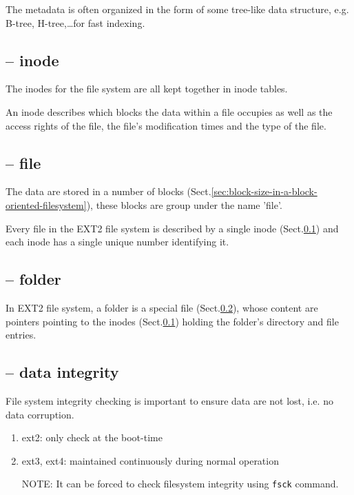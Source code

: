 The metadata is often organized in the form of some tree-like data structure,
e.g. B-tree, H-tree,\ldots for fast indexing. 


\subsection{-- inode}
\label{sec:inode-in-a-block-oriented-filesystem}

The inodes for the file system are all kept together in inode tables.

An inode describes which blocks the data within a file occupies as well as the
access rights of the file, the file's modification times and the type of the
file.

\subsection{-- file}
\label{sec:file-in-a-block-oriented-filesystem}

The data are stored in a number of blocks
(Sect.\ref{sec:block-size-in-a-block-oriented-filesystem}), these blocks are
group under the name 'file'.

Every file in the EXT2 file system is described by a single inode
(Sect.\ref{sec:inode-in-a-block-oriented-filesystem}) and each inode has a
single unique number identifying it.


\subsection{-- folder}
\label{sec:folder-in-a-block-oriented-filesystem}

In EXT2 file system, a folder is a special file
(Sect.\ref{sec:file-in-a-block-oriented-filesystem}), whose content are pointers
pointing to the inodes (Sect.\ref{sec:inode-in-a-block-oriented-filesystem})
holding the folder's directory and file entries.

\subsection{-- data integrity}
\label{sec:data-integrity-in-a-block-oriented-filesystem}

File system integrity checking is important to ensure data are not lost, i.e. no
data corruption.
\begin{enumerate}
  \item ext2: only check at the boot-time
  
  \item ext3, ext4: maintained continuously during normal operation 
  
  
NOTE: It can be forced to check filesystem integrity using \verb!fsck! command.
  
\end{enumerate}

